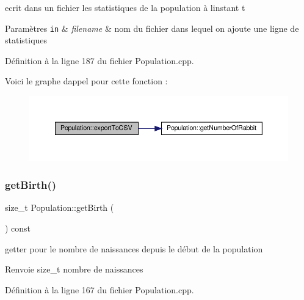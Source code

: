 ecrit dans un fichier les statistiques de la population à l\textquotesingle{}instant t 


\begin{DoxyParams}[1]{Paramètres}
\mbox{\tt in}  & {\em filename} & nom du fichier dans lequel on ajoute une ligne de statistiques \\
\hline
\end{DoxyParams}


Définition à la ligne 187 du fichier Population.\+cpp.

Voici le graphe d\textquotesingle{}appel pour cette fonction \+:
\nopagebreak
\begin{figure}[H]
\begin{center}
\leavevmode
\includegraphics[width=350pt]{classPopulation_a4c7cc56a0bce95aa909bc75df7043f1a_cgraph}
\end{center}
\end{figure}
\mbox{\label{classPopulation_a703218d79e0d156a10c19e70d7433fa9}} 
\subsubsection{\texorpdfstring{get\+Birth()}{getBirth()}}
{\footnotesize\ttfamily size\+\_\+t Population\+::get\+Birth (\begin{DoxyParamCaption}{ }\end{DoxyParamCaption}) const}



getter pour le nombre de naissances depuis le début de la population 

\begin{DoxyReturn}{Renvoie}
size\+\_\+t nombre de naissances 
\end{DoxyReturn}


Définition à la ligne 167 du fichier Population.\+cpp.

